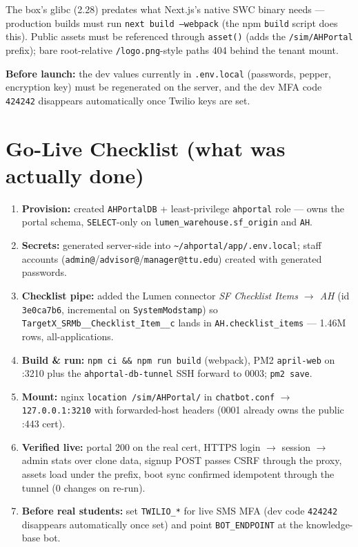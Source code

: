 \documentclass[11pt,letterpaper]{report}
\begin{document}
\begin{warnbox}
The box's glibc (2.28) predates what Next.js's native SWC binary needs ---
production builds must run \texttt{next build --webpack} (the npm
\texttt{build} script does this). Public assets must be referenced through
\texttt{asset()} (adds the \texttt{/sim/AHPortal} prefix); bare root-relative
\texttt{/logo.png}-style paths 404 behind the tenant mount.
\end{warnbox}

\begin{warnbox}
\textbf{Before launch:} the dev values currently in \texttt{.env.local}
(passwords, pepper, encryption key) must be regenerated on the server, and the
dev MFA code \texttt{424242} disappears automatically once Twilio keys are set.
\end{warnbox}

\section{Go-Live Checklist (what was actually done)}

\begin{enumerate}[leftmargin=1.6em]
  \item \textbf{Provision:} created \texttt{AHPortalDB} + least-privilege
        \texttt{ahportal} role --- owns the portal schema, \texttt{SELECT}-only
        on \texttt{lumen\_warehouse.sf\_origin} and \texttt{AH}.
  \item \textbf{Secrets:} generated server-side into
        \texttt{\textasciitilde/ahportal/app/.env.local}; staff accounts
        (\texttt{admin@}/\texttt{advisor@}/\texttt{manager@ttu.edu}) created
        with generated passwords.
  \item \textbf{Checklist pipe:} added the Lumen connector \emph{SF Checklist
        Items $\rightarrow$ AH} (id \texttt{3e0ca7b6}, incremental on
        \texttt{SystemModstamp}) so \texttt{TargetX\_SRMb\_\_Checklist\_Item\_\_c}
        lands in \texttt{AH.checklist\_items} --- 1.46M rows, all-applications.
  \item \textbf{Build \& run:} \texttt{npm ci \&\& npm run build}
        (webpack), PM2 \texttt{april-web} on :3210 plus the
        \texttt{ahportal-db-tunnel} SSH forward to 0003; \texttt{pm2 save}.
  \item \textbf{Mount:} nginx \texttt{location /sim/AHPortal/} in
        \texttt{chatbot.conf} $\rightarrow$ \texttt{127.0.0.1:3210} with
        forwarded-host headers (0001 already owns the public :443 cert).
  \item \textbf{Verified live:} portal 200 on the real cert, HTTPS login
        $\rightarrow$ session $\rightarrow$ admin stats over clone data, signup
        POST passes CSRF through the proxy, assets load under the prefix, boot
        sync confirmed idempotent through the tunnel (0 changes on re-run).
  \item \textbf{Before real students:} set \texttt{TWILIO\_*} for live SMS MFA
        (dev code \texttt{424242} disappears automatically once set) and point
        \texttt{BOT\_ENDPOINT} at the knowledge-base bot.
\end{enumerate}
\end{document}
